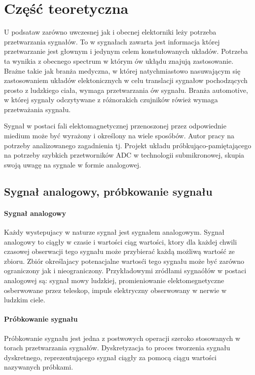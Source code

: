 

\chapter{Część teoretyczna}
U podsataw zarówno uwczesnej jak i obecnej elektorniki leży potrzeba przetwarzania sygnałów. To w sygnałach zawarta jest informacja której
przetwarzanie jest głownym i jedynym celem konstułowanych układów. Potrzeba ta wynikia z obecnego spectrum w którym ów ukłądu znajują zastosowanie.
Brażne takie jak branża medyczna, w której natychmiastowo nasuwającym się zastosowaniem układów elektonicznych w celu translacji sygnałow
pochodzących prosto z ludzkiego ciała, wymaga przetwarzania ów sygnału.
Branża automotive, w której sygnały odczytywane z różnorakich czujników rówież wymaga przetważania sygnału.

Sygnał w postaci fali elektomagnetycznej przenoszonej przez odpowiednie miedium może być wyrażony i określony na wiele sposóbów.
Autor pracy na potrzeby analizowanego zagadnienia tj. Projekt układu próbkująco-pamiętającego na potrzeby szybkich przetworników ADC w technologii submikronowej,
skupia swoją uwagę na sygnale w formie analogowej.

\section{Sygnał analogowy, próbkowanie sygnału}
\subsubsection{Sygnał analogowy}

Każdy wystepujacy w naturze sygnał jest sygnałem analogowym. Sygnał analogowy to ciągły w czasie i wartości ciąg wartości, ktory dla każdej chwili czasowej obserwacji tego sygnału może
przybierać każdą możliwą wartość ze zbioru. Zbiór określajacy potenacjalne wartosći tego sygnału może być zarówno ograniczony jak i nieograniczony.
Przykładowymi zródłami sygnaółów w postaci analogowej są: sygnał mowy ludzkiej, promieniowanie elektomegnetyczne osberwowane przez teleskop, impuls elektryczny 
obserwowany w nerwie w ludzkim ciele. 

\subsubsection{Próbkowanie sygnału}
Próbkowanie sygnału jest jedna z postwowych operacji szeroko stosowanych w torach przetwarzania sygnałów.
Dyskretyzacja to proces tworzenia sygnału dyskretnego, reprezentującego sygnał ciągły za pomocą ciągu wartości nazywanych próbkami.

